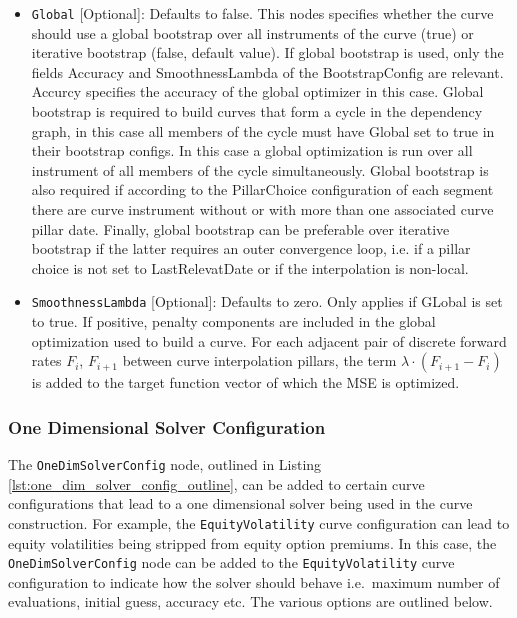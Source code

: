 \begin{itemize}
\item \lstinline!Global! [Optional]: Defaults to false. This nodes specifies whether the curve should use a global
  bootstrap over all instruments of the curve (true) or iterative bootstrap (false, default value). If global bootstrap
  is used, only the fields Accuracy and SmoothnessLambda of the BootstrapConfig are relevant. Accurcy specifies the
  accuracy of the global optimizer in this case.  Global bootstrap is required to build curves that form a cycle in the
  dependency graph, in this case all members of the cycle must have Global set to true in their bootstrap configs. In
  this case a global optimization is run over all instrument of all members of the cycle simultaneously. Global
  bootstrap is also required if according to the PillarChoice configuration of each segment there are curve instrument
  without or with more than one associated curve pillar date. Finally, global bootstrap can be preferable over iterative
  bootstrap if the latter requires an outer convergence loop, i.e. if a pillar choice is not set to LastRelevatDate or
  if the interpolation is non-local.

\item \lstinline!SmoothnessLambda! [Optional]: Defaults to zero. Only applies if GLobal is set to true. If positive,
  penalty components are included in the global optimization used to build a curve. For each adjacent pair of discrete
  forward rates $F_i$, $F_{i+1}$ between curve interpolation pillars, the term $\lambda\cdot(F_{i+1} - F_i)$ is added to
  the target function vector of which the MSE is optimized.

\end{itemize}

\subsubsection{One Dimensional Solver Configuration}
\label{sec:one_dim_solver_config}
The \lstinline!OneDimSolverConfig! node, outlined in Listing \ref{lst:one_dim_solver_config_outline}, can be added to certain curve configurations that lead to a one dimensional solver being used in the curve construction. For example, the \lstinline!EquityVolatility! curve configuration can lead to equity volatilities being stripped from equity option premiums. In this case, the \lstinline!OneDimSolverConfig! node can be added to the \lstinline!EquityVolatility! curve configuration to indicate how the solver should behave i.e.\ maximum number of evaluations, initial guess, accuracy etc. The various options are outlined below.

